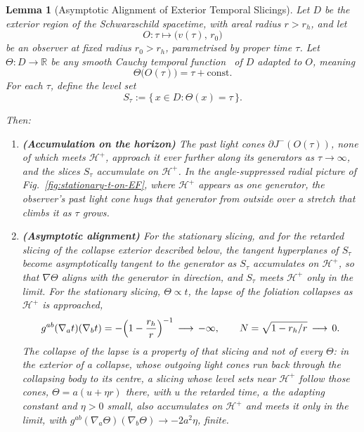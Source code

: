 \documentclass[11pt,a4paper]{article}
\theoremstyle{plain}
\newtheorem{lemma}{Lemma}
\theoremstyle{remark}
\begin{document}
\begin{lemma}[Asymptotic Alignment of Exterior Temporal Slicings]\label{lem:alignment}
Let $D$ be the exterior region of the Schwarzschild spacetime, with areal radius $r>r_h$, and let
\[O : \tau \mapsto \bigl(v(\tau),\, r_0\bigr)\]
be an observer at fixed radius $r_0>r_h$, parametrised by proper time $\tau$.  
Let $\Theta : D \to \mathbb{R}$ be any smooth Cauchy temporal function~\cite{BernalSanchez2005} of $D$ adapted to $O$, meaning
\[\Theta\bigl(O(\tau)\bigr)=\tau+\mathrm{const}.\]
For each $\tau$, define the level set 
\[S_\tau := \{\, x \in D : \Theta(x)=\tau\,\}.\]

Then:
\begin{enumerate}

\item[(i)] \textbf{(Accumulation on the horizon)}  
The past light cones $\partial J^{-}(O(\tau))$, none of which meets $\mathcal{H}^+$, approach it ever further along its generators as $\tau \to \infty$, and the slices $S_\tau$ accumulate on $\mathcal{H}^+$. In the angle-suppressed radial picture of Fig.~\ref{fig:stationary-t-on-EF}, where $\mathcal{H}^+$ appears as one generator, the observer's past light cone hugs that generator from outside over a stretch that climbs it as $\tau$ grows.

\item[(ii)] \textbf{(Asymptotic alignment)}  
For the stationary slicing, and for the retarded slicing of the collapse exterior described below, the tangent hyperplanes of $S_\tau$ become asymptotically tangent to the generator as $S_\tau$ accumulates on $\mathcal{H}^+$, so that $\nabla\Theta$ aligns with the generator in direction, and $S_\tau$ meets $\mathcal{H}^+$ only in the limit. For the stationary slicing, $\Theta\propto t$, the lapse of the foliation collapses as $\mathcal{H}^+$ is approached,
\[
g^{ab}(\nabla_a t)(\nabla_b t)=-\Bigl(1-\frac{r_h}{r}\Bigr)^{-1}\,\longrightarrow\,-\infty,
\qquad N=\sqrt{1-r_h/r}\,\longrightarrow\,0 .
\]
The collapse of the lapse is a property of that slicing and not of every $\Theta$: in the exterior of a collapse, whose outgoing light cones run back through the collapsing body to its centre, a slicing whose level sets near $\mathcal{H}^+$ follow those cones, $\Theta=a(u+\eta r)$ there, with $u$ the retarded time, $a$ the adapting constant and $\eta>0$ small, also accumulates on $\mathcal{H}^+$ and meets it only in the limit, with $g^{ab}(\nabla_a\Theta)(\nabla_b\Theta)\to-2a^{2}\eta$, finite.

\end{enumerate}
\end{lemma}
\end{document}
